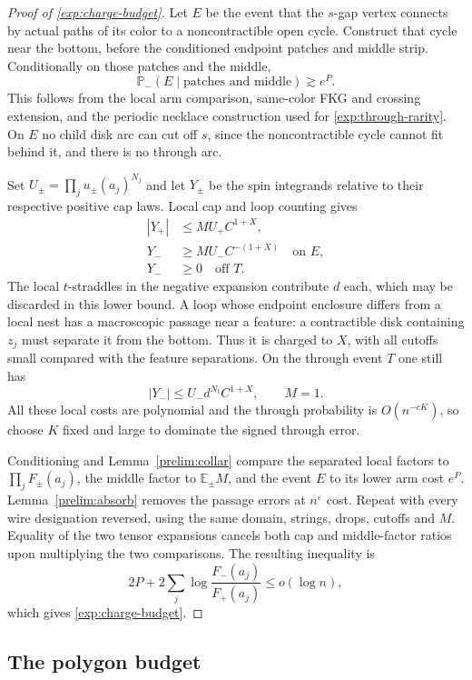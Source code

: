 \begin{proof}[Proof of \eqref{exp:charge-budget}]
Let $E$ be the event that the $s$-gap vertex connects by actual paths
of its color to a noncontractible open cycle. Construct that cycle near
the bottom, before the conditioned endpoint patches and middle strip.
Conditionally on those patches and the middle,
\[
 \mathbb P_-(E\mid\text{patches and middle})\gtrsim e^P.
\]
This follows from the local arm comparison, same-color FKG and crossing
extension, and the periodic necklace construction used for
\eqref{exp:through-rarity}. On $E$ no child disk arc can cut off $s$,
since the noncontractible cycle cannot fit behind it, and there is no
through arc.

Set $U_\pm=\prod_j u_\pm(a_j)^{N_j}$ and let $Y_\pm$ be the spin
integrands relative to their respective positive cap laws. Local cap
and loop counting gives
\begin{align*}
 |Y_+|&\le M U_+ C^{1+X},\\
 Y_-&\ge M U_- C^{-(1+X)}\quad\text{on }E,\\
 Y_-&\ge0\quad\text{off }T.
\end{align*}
The local $t$-straddles in the negative expansion contribute $d$ each,
which may be discarded in this lower bound. A loop whose endpoint
enclosure differs from a local nest has a macroscopic passage near a
feature: a contractible disk containing $z_j$ must separate it from
the bottom. Thus it is charged to $X$, with all cutoffs small compared
with the feature separations. On the through event $T$ one still has
\[
 |Y_-|\le U_-d^{N_t}C^{1+X},\qquad M=1.
\]
All these local costs are polynomial and the through probability is
$O(n^{-cK})$, so choose $K$ fixed and large to dominate the signed
through error.

Conditioning and Lemma~\ref{prelim:collar} compare the separated local
factors to $\prod_jF_\pm(a_j)$, the middle factor to
$\mathbb E_\pm M$, and the event $E$ to its lower arm cost $e^P$.
Lemma~\ref{prelim:absorb} removes the passage errors at $n^\varepsilon$
cost. Repeat with every wire designation reversed, using the same
domain, strings, drops, cutoffs and $M$. Equality of the two tensor
expansions cancels both cap and middle-factor ratios upon multiplying
the two comparisons. The resulting inequality is
\[
 2P+2\sum_j\log\frac{F_-(a_j)}{F_+(a_j)}
 \le o(\log n),
\]
which gives \eqref{exp:charge-budget}.
\end{proof}

\subsection{The polygon budget}

